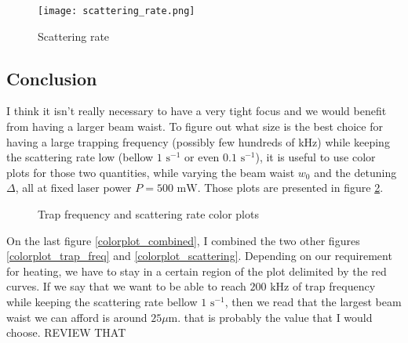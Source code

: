 \documentclass[reprint,amsmath,amssymb,aps,nofootinbib]{revtex4-1}
\begin{document}
\begin{figure}
\begin{center}
\centering
\texttt{[image: scattering\_rate.png]}
\caption{\label{scattering_rate_image}Scattering rate}
\end{center}
\end{figure}

\subsection{Conclusion}

I think it isn't really necessary to have a very tight focus and we would benefit from having a larger beam waist. To figure out what size is the best choice for having a large trapping frequency (possibly few hundreds of kHz) while keeping the scattering rate low (bellow $1\text{ s}^{-1}$ or even $0.1\text{ s}^{-1}$), it is useful to use color plots for those two quantities, while varying the beam waist $w_{0}$ and the detuning $\Delta$, all at fixed laser power $P = 500\text{ mW}$. Those plots are presented in figure \ref{colorplots}.

\begin{figure}
\begin{center}
\caption{\label{colorplots}Trap frequency and scattering rate color plots}
\end{center}
\end{figure}

On the last figure \ref{colorplot_combined}, I combined the two other figures \ref{colorplot_trap_freq} and \ref{colorplot_scattering}. Depending on our requirement for heating, we have to stay in a certain region of the plot delimited by the red curves. If we say that we want to be able to reach $200\text{ kHz}$ of trap frequency while keeping the scattering rate bellow $1\text{ s}^{-1}$, then we read that the largest beam waist we can afford is around $25\mu\text{m}$. that is probably the value that I would choose. REVIEW THAT
\end{document}
